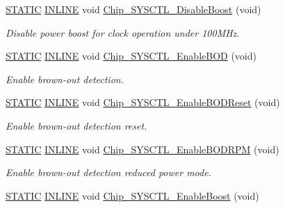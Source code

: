 \begin{DoxyCompactItemize}
\hyperlink{group__LPC__Types__Public__Macros_ga10b2d890d871e1489bb02b7e70d9bdfb}{S\+T\+A\+T\+IC} \hyperlink{group__LPC__Types__Public__Types_ga2eb6f9e0395b47b8d5e3eeae4fe0c116}{I\+N\+L\+I\+NE} void \hyperlink{group__SYSCTL__17XX__40XX_ga3c49515056cbc9af430e33f9d8401487}{Chip\+\_\+\+S\+Y\+S\+C\+T\+L\+\_\+\+Disable\+Boost} (void)
\begin{DoxyCompactList}\small\item\em Disable power boost for clock operation under 100\+M\+Hz. \end{DoxyCompactList}\item 
\hyperlink{group__LPC__Types__Public__Macros_ga10b2d890d871e1489bb02b7e70d9bdfb}{S\+T\+A\+T\+IC} \hyperlink{group__LPC__Types__Public__Types_ga2eb6f9e0395b47b8d5e3eeae4fe0c116}{I\+N\+L\+I\+NE} void \hyperlink{group__SYSCTL__17XX__40XX_ga68a4fd386020cb12d47b03f95903b9f1}{Chip\+\_\+\+S\+Y\+S\+C\+T\+L\+\_\+\+Enable\+B\+OD} (void)
\begin{DoxyCompactList}\small\item\em Enable brown-\/out detection. \end{DoxyCompactList}\item 
\hyperlink{group__LPC__Types__Public__Macros_ga10b2d890d871e1489bb02b7e70d9bdfb}{S\+T\+A\+T\+IC} \hyperlink{group__LPC__Types__Public__Types_ga2eb6f9e0395b47b8d5e3eeae4fe0c116}{I\+N\+L\+I\+NE} void \hyperlink{group__SYSCTL__17XX__40XX_ga4b04d78cf397ffd3980b2f4ded6a055d}{Chip\+\_\+\+S\+Y\+S\+C\+T\+L\+\_\+\+Enable\+B\+O\+D\+Reset} (void)
\begin{DoxyCompactList}\small\item\em Enable brown-\/out detection reset. \end{DoxyCompactList}\item 
\hyperlink{group__LPC__Types__Public__Macros_ga10b2d890d871e1489bb02b7e70d9bdfb}{S\+T\+A\+T\+IC} \hyperlink{group__LPC__Types__Public__Types_ga2eb6f9e0395b47b8d5e3eeae4fe0c116}{I\+N\+L\+I\+NE} void \hyperlink{group__SYSCTL__17XX__40XX_ga6fa1a6e737b1ac612ee778894303a270}{Chip\+\_\+\+S\+Y\+S\+C\+T\+L\+\_\+\+Enable\+B\+O\+D\+R\+PM} (void)
\begin{DoxyCompactList}\small\item\em Enable brown-\/out detection reduced power mode. \end{DoxyCompactList}\item 
\hyperlink{group__LPC__Types__Public__Macros_ga10b2d890d871e1489bb02b7e70d9bdfb}{S\+T\+A\+T\+IC} \hyperlink{group__LPC__Types__Public__Types_ga2eb6f9e0395b47b8d5e3eeae4fe0c116}{I\+N\+L\+I\+NE} void \hyperlink{group__SYSCTL__17XX__40XX_gaaf987cc6cf1398ae226aaebb975a6372}{Chip\+\_\+\+S\+Y\+S\+C\+T\+L\+\_\+\+Enable\+Boost} (void)

\end{DoxyCompactItemize}
